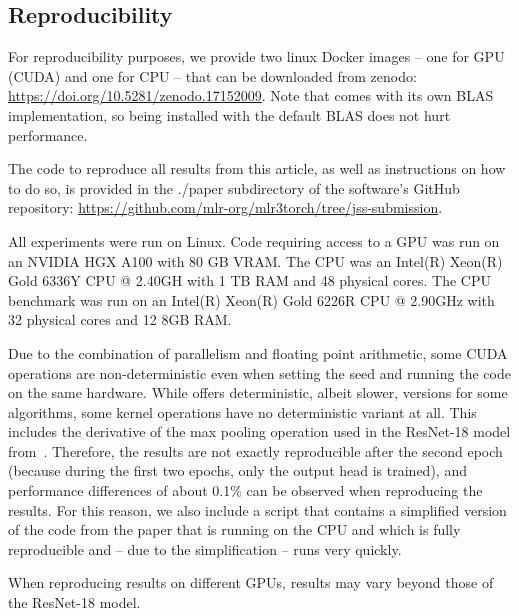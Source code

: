 \documentclass[article]{jss}
\theoremstyle{definition}
\begin{document}
\begin{appendix}

\newpage
\section{Reproducibility}\label{app:comp-details}

For reproducibility purposes, we provide two linux Docker images -- one for GPU (CUDA) and one for CPU -- that can be downloaded from zenodo: \url{https://doi.org/10.5281/zenodo.17152009}.
Note that \torch{} comes with its own BLAS implementation, so \rlang{} being installed with the default BLAS does not hurt performance.

The code to reproduce all results from this article, as well as instructions on how to do so, is provided in the ./paper subdirectory of the software's GitHub repository: \url{https://github.com/mlr-org/mlr3torch/tree/jss-submission}.

All experiments were run on Linux.
Code requiring access to a GPU was run on an NVIDIA HGX A100 with 80 GB VRAM.
The CPU was an Intel(R) Xeon(R) Gold 6336Y CPU @ 2.40GH with 1 TB RAM and 48 physical cores.
The CPU benchmark was run on an Intel(R) Xeon(R) Gold 6226R CPU @ 2.90GHz with 32 physical cores and 12 8GB RAM.

Due to the combination of parallelism and floating point arithmetic, some CUDA operations are non-deterministic even when setting the seed and running the code on the same hardware.
While \libtorch{} offers deterministic, albeit slower, versions for some algorithms, some kernel operations have no deterministic variant at all. This includes the derivative of the max pooling operation used in the ResNet-18 model from~.
Therefore, the results are not exactly reproducible after the second epoch (because during the first two epochs, only the output head is trained), and performance differences of about 0.1\% can be observed when reproducing the results.
For this reason, we also include a script that contains a simplified version of the code from the paper that is running on the CPU and which is fully reproducible and -- due to the simplification -- runs very quickly.

When reproducing results on different GPUs, results may vary beyond those of the ResNet-18 model.

\end{appendix}
\end{document}
